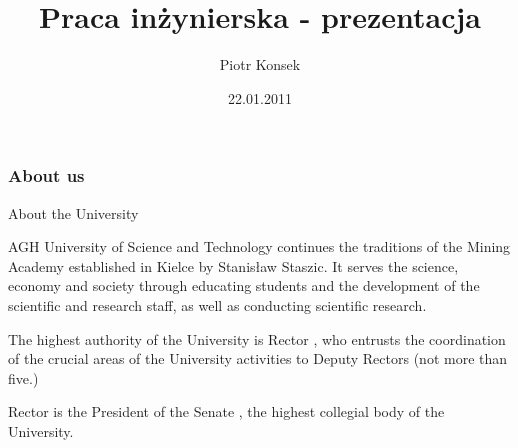 \documentclass{beamer}
\title[Praca inżynierska prezentacja]{Praca inżynierska - prezentacja}
\author[P. Konsek]{Piotr Konsek}
\date[2011]{22.01.2011}
\institute[AGH-UST]
{Faculty of EEACSE\\ 
Department of Automatics
}
\begin{document}
{
 \begin{frame}
   \titlepage
 \end{frame}
}



\begin{frame}
\frametitle{About us}

\begin{block}{About the University}

AGH University of Science and Technology continues the traditions of the Mining Academy established in Kielce by Stanisław Staszic. It serves the science, economy and society through educating students and the development of the scientific and research staff, as well as conducting scientific research.

The highest authority of the University is Rector , who entrusts the coordination of the crucial areas of the University activities to Deputy Rectors (not more than five.)

Rector is the President of the Senate , the highest collegial body of the University. 
\end{block}
\end{frame}

\end{document}
